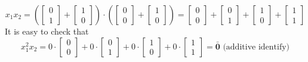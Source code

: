 \begin{mdframed}
{\[
x_1x_2 = 
\left(
\begin{bmatrix}
0\\
1
\end{bmatrix}
+ 
\begin{bmatrix}
1\\
0
\end{bmatrix}
\right)\cdot 
\left(
\begin{bmatrix}
0\\
0
\end{bmatrix}
+
\begin{bmatrix}
1\\
0
\end{bmatrix}
\right) =
\begin{bmatrix}
0\\
0
\end{bmatrix}
+
\begin{bmatrix}
0\\
1
\end{bmatrix}
+
\begin{bmatrix}
1\\
0
\end{bmatrix}
+
\begin{bmatrix}
1\\
1
\end{bmatrix}
\]
It is easy to check that
\[
x_1^2x_2 = 
0\cdot
\begin{bmatrix}
0\\
0
\end{bmatrix}
+ 0\cdot
\begin{bmatrix}
0\\
1
\end{bmatrix}
+ 0\cdot
\begin{bmatrix}
1\\
0
\end{bmatrix}
+ 0\cdot
\begin{bmatrix}
1\\
1
\end{bmatrix}
= \mathbf{\bar{0}} \text{ (additive identify)}
\]
}
\end{mdframed}


